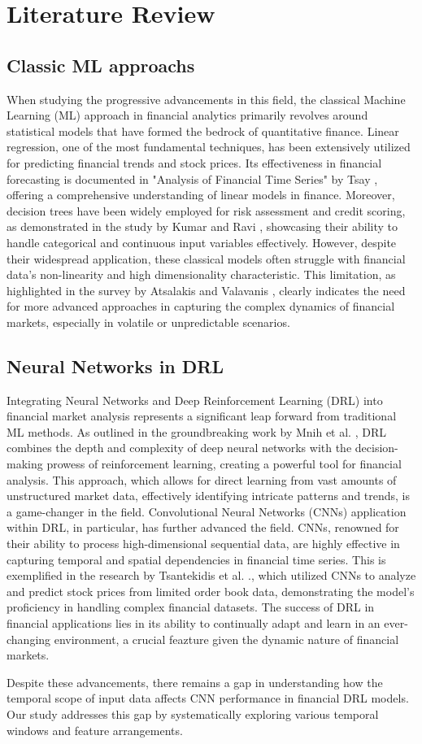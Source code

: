 \section{Literature Review}
\label{sec:litriv}

\subsection{Classic ML approachs}
When studying the progressive advancements in this field, the classical Machine Learning (ML) approach in financial analytics primarily revolves around statistical models that have formed the bedrock of quantitative finance. Linear regression, one of the most fundamental techniques, has been extensively utilized for predicting financial trends and stock prices. Its effectiveness in financial forecasting is documented in "Analysis of Financial Time Series" by Tsay \cite{Tsay2010}, offering a comprehensive understanding of linear models in finance. Moreover, decision trees have been widely employed for risk assessment and credit scoring, as demonstrated in the study by Kumar and Ravi \cite{Kumar2007}, showcasing their ability to handle categorical and continuous input variables effectively. However, despite their widespread application, these classical models often struggle with financial data's non-linearity and high dimensionality characteristic. This limitation, as highlighted in the survey by Atsalakis and Valavanis \cite{Atsalakis2009}, clearly indicates the need for more advanced approaches in capturing the complex dynamics of financial markets, especially in volatile or unpredictable scenarios.

\subsection{Neural Networks in DRL}
Integrating Neural Networks and Deep Reinforcement Learning (DRL) into financial market analysis represents a significant leap forward from traditional ML methods. As outlined in the groundbreaking work by Mnih et al. \cite{Mnih2015}, DRL combines the depth and complexity of deep neural networks with the decision-making prowess of reinforcement learning, creating a powerful tool for financial analysis. This approach, which allows for direct learning from vast amounts of unstructured market data, effectively identifying intricate patterns and trends, is a game-changer in the field. Convolutional Neural Networks (CNNs) application within DRL, in particular, has further advanced the field. CNNs, renowned for their ability to process high-dimensional sequential data, are highly effective in capturing temporal and spatial dependencies in financial time series. This is exemplified in the research by Tsantekidis et al. \cite{Tsantekidis2017}., which utilized CNNs to analyze and predict stock prices from limited order book data, demonstrating the model's proficiency in handling complex financial datasets. The success of DRL in financial applications lies in its ability to continually adapt and learn in an ever-changing environment, a crucial feazture given the dynamic nature of financial markets. 

Despite these advancements, there remains a gap in understanding how the temporal scope of input data affects CNN performance in financial DRL models. Our study addresses this gap by systematically exploring various temporal windows and feature arrangements.